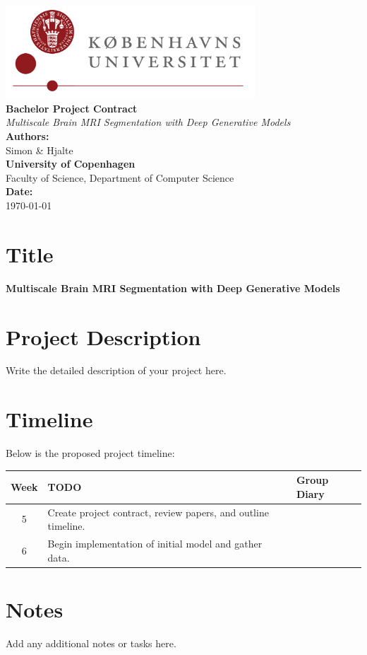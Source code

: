 \documentclass[12pt]{report}
\newcommand{\universitylogo}{\includegraphics[width=0.7\textwidth]{ku_logo_dk_hh.png}}
\begin{document}
\begin{titlepage}
  \begin{center}
      \universitylogo \\[1.5cm] %
      {\Huge \textbf{Bachelor Project Contract}} \\[0.8cm]
      {\Large \textit{Multiscale Brain MRI Segmentation with Deep Generative Models}} \\[2cm]
      {\Large \textbf{Authors:}} \\
      Simon \& Hjalte \\[1.5cm]
      {\Large \textbf{University of Copenhagen}} \\[0.5cm]
      {\Large Faculty of Science, Department of Computer Science} \\[1.5cm]
      {\Large \textbf{Date:}} \\
      \today
  \end{center}
  \vfill
\end{titlepage}

\pagestyle{fancy} %

\section*{Title}
\textbf{Multiscale Brain MRI Segmentation with Deep Generative Models}

\section*{Project Description}
Write the detailed description of your project here.

\section{Timeline}
Below is the proposed project timeline:
\vspace{1em}

\def\arraystretch{1.2} %
\noindent\begin{tabular}{|c|p{11cm}|p{4cm}|}
    \hline
    \textbf{Week} & \textbf{TODO} & \textbf{Group Diary} \\ \hline \hline
    5 & Create project contract, review papers, and outline timeline. & \\ \hline
    6 & Begin implementation of initial model and gather data. & \\ \hline
\end{tabular}

\section*{Notes}
Add any additional notes or tasks here.

 
 
\end{document}
